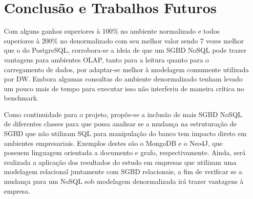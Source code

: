 \documentclass[12pt]{article}
\begin{document}
\section{Conclusão e Trabalhos Futuros}

Com alguns ganhos superiores à 100\% no ambiente normalizado e todos superiores à 
200\% no denormalizado com seu melhor valor sendo 7 vezes melhor que o do PostgreSQL, 
corrobora-se a ideia de que um SGBD NoSQL pode trazer vantagens para ambientes OLAP, 
tanto para a leitura quanto para o carregamento de dados,  
por adaptar-se melhor à modelagem comumente utilizada por DW. Embora algumas consultas 
do ambiente denormalizado tenham levado um pouco mais de tempo para executar isso não 
interferiu de maneira crítica no benchmark.

Como continuidade para o projeto, propõe-se a inclusão de mais SGBD NoSQL de 
diferentes classes para que possa analisar se a mudança na estruturação de SGBD 
que não utilizam SQL para manipulação do banco tem impacto direto em ambientes empresariais. 
Exemplos destes são o MongoDB e o Neo4J, que possuem linguagem orientada a documento e 
grafo, respectivamente. Ainda, será realizada a aplicação dos resultados do estudo em 
empresas que utilizam uma modelagem relacional juntamente com SGBD relacionais, a fim 
de verificar se a mudança para um NoSQL sob modelagem denormalizada irá trazer 
vantagens à empresa.



\end{document}
